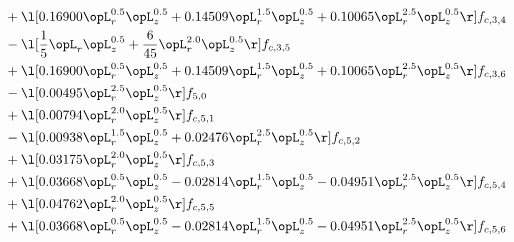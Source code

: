 \begin{alignat}{2}
& + \l[  0.16900 \opL_r^{0.5} \opL_z^{0.5} +  0.14509 \opL_r^{1.5} \opL_z^{0.5} +  0.10065 \opL_r^{2.5} \opL_z^{0.5}  \r] f_{c,3,4} \nonumber \\ 
& - \l[ \frac{1}{5} \opL_r \opL_z^{0.5} + \frac{6}{45} \opL_r^{2.0} \opL_z^{0.5}  \r] f_{c,3,5} \nonumber \\ 
& + \l[  0.16900 \opL_r^{0.5} \opL_z^{0.5} +  0.14509 \opL_r^{1.5} \opL_z^{0.5} +  0.10065 \opL_r^{2.5} \opL_z^{0.5}  \r] f_{c,3,6} \nonumber \\ 
& - \l[  0.00495 \opL_r^{2.5} \opL_z^{0.5}  \r] f_{5,0} \nonumber \\ 
& + \l[  0.00794 \opL_r^{2.0} \opL_z^{0.5}  \r] f_{c,5,1} \nonumber \\ 
& - \l[  0.00938 \opL_r^{1.5} \opL_z^{0.5} +  0.02476 \opL_r^{2.5} \opL_z^{0.5}  \r] f_{c,5,2} \nonumber \\ 
& + \l[  0.03175 \opL_r^{2.0} \opL_z^{0.5}  \r] f_{c,5,3} \nonumber \\ 
& + \l[  0.03668 \opL_r^{0.5} \opL_z^{0.5}   -0.02814 \opL_r^{1.5} \opL_z^{0.5}   -0.04951 \opL_r^{2.5} \opL_z^{0.5}  \r] f_{c,5,4} \nonumber \\ 
& + \l[  0.04762 \opL_r^{2.0} \opL_z^{0.5}  \r] f_{c,5,5} \nonumber \\ 
& + \l[  0.03668 \opL_r^{0.5} \opL_z^{0.5}   -0.02814 \opL_r^{1.5} \opL_z^{0.5}   -0.04951 \opL_r^{2.5} \opL_z^{0.5}  \r] f_{c,5,6} \nonumber \\ 
\end{alignat} 


